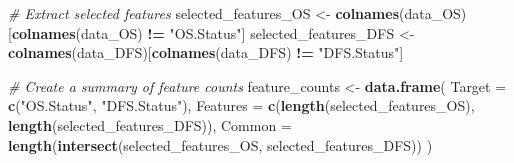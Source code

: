 \documentclass[
]{article}
\newenvironment{Shaded}{\begin{snugshade}}{\end{snugshade}}
\newcommand{\AttributeTok}[1]{\textcolor[rgb]{0.13,0.29,0.53}{#1}}
\newcommand{\CommentTok}[1]{\textcolor[rgb]{0.56,0.35,0.01}{\textit{#1}}}
\newcommand{\FloatTok}[1]{\textcolor[rgb]{0.00,0.00,0.81}{#1}}
\newcommand{\FunctionTok}[1]{\textcolor[rgb]{0.13,0.29,0.53}{\textbf{#1}}}
\newcommand{\NormalTok}[1]{#1}
\newcommand{\OtherTok}[1]{\textcolor[rgb]{0.56,0.35,0.01}{#1}}
\newcommand{\SpecialCharTok}[1]{\textcolor[rgb]{0.81,0.36,0.00}{\textbf{#1}}}
\newcommand{\StringTok}[1]{\textcolor[rgb]{0.31,0.60,0.02}{#1}}
\begin{document}
\begin{Shaded}
\end{Shaded}

\begin{Shaded}
\begin{Highlighting}[]
\CommentTok{\# Extract selected features}
\NormalTok{selected\_features\_OS }\OtherTok{\textless{}{-}} \FunctionTok{colnames}\NormalTok{(data\_OS)[}\FunctionTok{colnames}\NormalTok{(data\_OS) }\SpecialCharTok{!=} \StringTok{"OS.Status"}\NormalTok{]}
\NormalTok{selected\_features\_DFS }\OtherTok{\textless{}{-}} \FunctionTok{colnames}\NormalTok{(data\_DFS)[}\FunctionTok{colnames}\NormalTok{(data\_DFS) }\SpecialCharTok{!=} \StringTok{"DFS.Status"}\NormalTok{]}

\CommentTok{\# Create a summary of feature counts}
\NormalTok{feature\_counts }\OtherTok{\textless{}{-}} \FunctionTok{data.frame}\NormalTok{(}
  \AttributeTok{Target =} \FunctionTok{c}\NormalTok{(}\StringTok{"OS.Status"}\NormalTok{, }\StringTok{"DFS.Status"}\NormalTok{),}
  \AttributeTok{Features =} \FunctionTok{c}\NormalTok{(}\FunctionTok{length}\NormalTok{(selected\_features\_OS), }\FunctionTok{length}\NormalTok{(selected\_features\_DFS)),}
  \AttributeTok{Common =} \FunctionTok{length}\NormalTok{(}\FunctionTok{intersect}\NormalTok{(selected\_features\_OS, selected\_features\_DFS))}
\NormalTok{)}
\end{Highlighting}
\end{Shaded}
\end{document}
